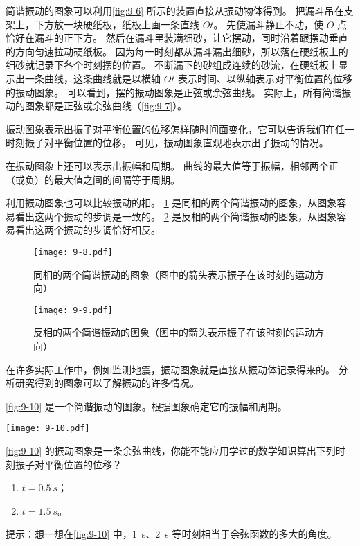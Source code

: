 简谐振动的图象可以利用\cref{fig:9-6} 所示的装置直接从振动物体得到。
把漏斗吊在支架上，下方放一块硬纸板，纸板上画一条直线 $Ot$。
先使漏斗静止不动，使 $O$ 点恰好在漏斗的正下方。
然后在漏斗里装满细砂，让它摆动，同时沿着跟摆动垂直的方向匀速拉动硬纸板。
因为每一时刻都从漏斗漏出细砂，所以落在硬纸板上的细砂就记录下各个时刻摆的位置。
不断漏下的砂组成连续的砂流，在硬纸板上显示出一条曲线，这条曲线就是以横轴 $Ot$ 表示时间、以纵轴表示对平衡位置的位移的振动图象。
可以看到，摆的振动图象是正弦或余弦曲线。
实际上，所有简谐振动的图象都是正弦或余弦曲线（\cref{fig:9-7}）。

振动图象表示出振子对平衡位置的位移怎样随时间面变化，它可以告诉我们在任一时刻振子对平衡位置的位移。
可见，振动图象直观地表示出了振动的情况。

在振动图象上还可以表示出振幅和周期。
曲线的最大值等于振幅，相邻两个正（或负）的最大值之间的间隔等于周期。

利用振动图象也可以比较振动的相。
\cref{fig:9-8} 是同相的两个简谐振动的图象，从图象容易看出这两个振动的步调是一致的。
\cref{fig:9-9} 是反相的两个简谐振动的图象，从图象容易看出这两个振动的步调恰好相反。

\begin{figure}
  \texttt{[image: 9-8.pdf]}
  \caption{同相的两个简谐振动的图象（图中的箭头表示振子在该时刻的运动方向）}\label{fig:9-8}
\end{figure}

\begin{figure}
  \texttt{[image: 9-9.pdf]}
  \caption{反相的两个简谐振动的图象（图中的箭头表示振子在该时刻的运动方向）}\label{fig:9-9}
\end{figure}

在许多实际工作中，例如监测地震，振动图象就是直接从振动体记录得来的。
分析研究得到的图象可以了解振动的许多情况。

\begin{Practice}
\begin{question}
  \item \cref{fig:9-10} 是一个简谐振动的图象。根据图象确定它的振幅和周期。
  \begin{figurehere}
    \begin{minipage}{\linewidth}\centering
      \texttt{[image: 9-10.pdf]}
      \caption{}\label{fig:9-10}
    \end{minipage}
  \end{figurehere}
  \item \cref{fig:9-10} 的振动图象是一条余弦曲线，你能不能应用学过的数学知识算出下列时刻振子对平衡位置的位移？
  \begin{enumerate}
    \item $t=\qty{0.5}{s}$；
    \item $t=\qty{1.5}{s}$。
  \end{enumerate}
  提示：想一想在\cref{fig:9-10} 中，\qty{1}{s}、\qty{2}{s} 等时刻相当于余弦函数的多大的角度。
\end{question}
\end{Practice}


